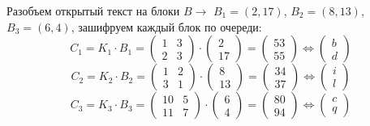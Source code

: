 \documentclass[a4paper]{article}
\begin{document}
  Разобъем открытый текст на блоки $B \rightarrow$ $B_1 = (2, 17)$,
  $B_2 = (8, 13)$, $B_3 = (6, 4)$, зашифруем каждый блок по очереди:
  \begin{equation}
    C_1 = K_1\cdot B_1 = \begin{pmatrix}
        1 & 3 \\ 2 & 3
    \end{pmatrix} \cdot \begin{pmatrix}
        2 \\ 17
    \end{pmatrix} = \begin{pmatrix}
        53 \\ 55
    \end{pmatrix} \Leftrightarrow \begin{pmatrix}
        b \\ d
    \end{pmatrix}
  \end{equation}
  \begin{equation}
    C_2 = K_2 \cdot B_2 = \begin{pmatrix}
        1 & 2 \\ 3 & 1
    \end{pmatrix} \cdot \begin{pmatrix}
        8 \\ 13
    \end{pmatrix} = \begin{pmatrix}
        34 \\ 37
    \end{pmatrix} \Leftrightarrow \begin{pmatrix}
        i \\ l
    \end{pmatrix}
  \end{equation}
  \begin{equation}
    C_3 = K_3 \cdot B_3 = \begin{pmatrix}
        10 & 5 \\ 11 & 7
    \end{pmatrix} \cdot \begin{pmatrix}
        6 \\ 4
    \end{pmatrix} = \begin{pmatrix}
        80 \\ 94
    \end{pmatrix} \Leftrightarrow \begin{pmatrix}
        c \\ q
    \end{pmatrix}
  \end{equation}
\end{document}
